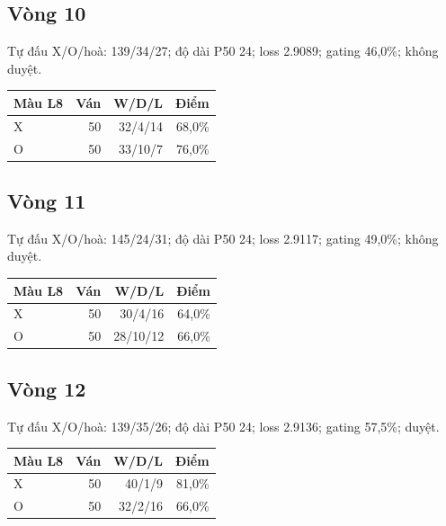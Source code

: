 \subsection*{Vòng 10}

Tự đấu X/O/hoà: 139/34/27; độ dài P50 24; loss 2.9089; gating 46,0\%; không duyệt.

\begin{center}\scriptsize\begin{tabular}{@{}lrrr@{}}\toprule

Màu L8 & Ván & W/D/L & Điểm \\

\midrule

X & 50 & 32/4/14 & 68,0\% \\

O & 50 & 33/10/7 & 76,0\% \\

\bottomrule\end{tabular}\end{center}

\subsection*{Vòng 11}

Tự đấu X/O/hoà: 145/24/31; độ dài P50 24; loss 2.9117; gating 49,0\%; không duyệt.

\begin{center}\scriptsize\begin{tabular}{@{}lrrr@{}}\toprule

Màu L8 & Ván & W/D/L & Điểm \\

\midrule

X & 50 & 30/4/16 & 64,0\% \\

O & 50 & 28/10/12 & 66,0\% \\

\bottomrule\end{tabular}\end{center}

\subsection*{Vòng 12}

Tự đấu X/O/hoà: 139/35/26; độ dài P50 24; loss 2.9136; gating 57,5\%; duyệt.

\begin{center}\scriptsize\begin{tabular}{@{}lrrr@{}}\toprule

Màu L8 & Ván & W/D/L & Điểm \\

\midrule

X & 50 & 40/1/9 & 81,0\% \\

O & 50 & 32/2/16 & 66,0\% \\

\bottomrule\end{tabular}\end{center}

